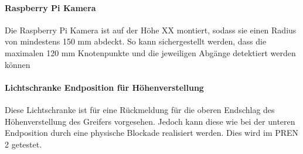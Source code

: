 \documentclass[main.tex]{subfiles} %
\begin{document}
\paragraph{Raspberry Pi Kamera}
Die Raspberry Pi Kamera ist auf der Höhe XX montiert, sodass sie einen Radius von mindestens 150 mm abdeckt.
So kann sichergestellt werden, dass die maximalen 120 mm Knotenpunkte und die jeweiligen Abgänge detektiert werden können


\paragraph{Lichtschranke Endposition für Höhenverstellung}
Diese Lichtschranke ist für eine Rückmeldung für die oberen Endschlag des Höhenverstellung des Greifers vorgesehen.
Jedoch kann diese wie bei der unteren Endposition durch eine physische Blockade realisiert werden. Dies wird im PREN 2 getestet.
\end{document}
